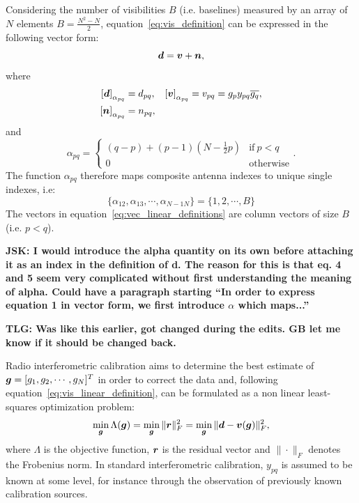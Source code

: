 \documentclass[useAMS,usenatbib]{mn2e}
\newcommand{\br}{\bmath{r}}
\newcommand{\bg}{\bmath{g}}
\newcommand{\bd}{\bmath{d}}
\newcommand{\bv}{\bmath{v}}
\newcommand{\bn}{\bmath{n}}
\newcommand{\conj}[1]{\overline{#1}}
\begin{document}
Considering the number of visibilities $B$ (i.e. baselines) measured by an array of $N$ elements $B = \frac{N^2-N}{2}$, equation~\ref{eq:vis_definition} can be expressed in the following vector form:
\begin{equation}
\label{eq:vis_linear_definition}
\bd = \bv + \bn, 
\end{equation}
where 
\begin{align}
 \left [ \bd \right]_{\alpha_{pq}} &= d_{pq}, & \left [ \bv \right ]_{\alpha_{pq}} &= v_{pq}=g_p y_{pq} \conj{g_q},\nonumber\\
 \left [ \bn \right ]_{\alpha_{pq}} &= n_{pq}, &  &\label{eq:vec_linear_definitions}
\end{align}
and 
\begin{equation}
\alpha_{pq} =
\begin{cases}
(q-p) + (p-1)\left (N-\frac{1}{2}p \right ) & \textrm{if}~p<q\\
0 & \textrm{otherwise}
\end{cases}.
\end{equation}
The function $\alpha_{pq}$ therefore maps composite antenna indexes to unique single indexes, i.e:
\begin{equation}
\{\alpha_{12},\alpha_{13},\cdots,\alpha_{N-1N}\} = \{1,2,\cdots,B\} 
\end{equation}
The vectors in equation~\ref{eq:vec_linear_definitions} are column vectors of size $B$ (i.e. $p<q$).

{\bf JSK: I would introduce the alpha quantity on its own before attaching it as an index in the definition of d. The reason for this is that eq. 4 and 5 seem very complicated without first understanding the meaning of alpha. Could have a paragraph starting ``In order to express equation 1 in vector form, we first introduce $\alpha$ which maps...''}

{\bf TLG: Was like this earlier, got changed during the edits. GB let me know if it should be changed back.}

Radio interferometric calibration aims to determine the best estimate of $\bg = [g_1,g_2,\cdots,g_N]^T$ in order to correct the data and, following equation~\ref{eq:vis_linear_definition}, can be formulated as a non linear least-squares optimization problem:
\begin{equation}
\label{eq:least_squares}
\min_{\bg} \Lambda(\bg) = \min_{\bg} \|\br\|_F^2 = \min_{\bg} \|\bd - \bv(\bg)\|_F^2, 
\end{equation}
where $\Lambda$ is the objective function, $\br$ is the residual vector and $\|\cdot\|_F$ denotes the Frobenius norm. In standard interferometric calibration, $y_{pq}$ is assumed to be known at some level, for instance through the observation of previously known calibration sources. 
\end{document}
